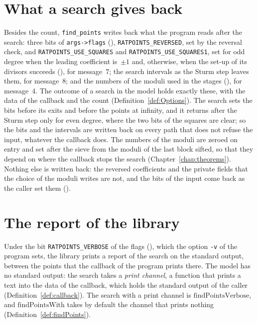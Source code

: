 \section{What a search gives back}\label{sec:outputBack}

Besides the count, \verb|find_points| writes back what the program reads after the search: three
bits of \verb|args->flags| (), \verb|RATPOINTS_REVERSED|, set by the
reversal check, and \verb|RATPOINTS_USE_SQUARES| and \verb|RATPOINTS_USE_SQUARES1|, set for odd
degree when the leading coefficient is~$\pm 1$ and, otherwise, when the set-up of its divisors
succeeds (), for message~7; the search intervals as the Sturm
step leaves them, for message~8; and the numbers of the moduli used in the stages
(), for message~4. The outcome of a search in the model holds exactly
these, with the data of the callback and the count (Definition~\ref{def:Options}). The search sets
the bits before its exits and before the points at infinity, and it returns after the Sturm step
only for even degree, where the two bits of the squares are clear; so the bits and the intervals are
written back on every path that does not refuse the input, whatever the callback does. The numbers
of the moduli are zeroed on entry and set after the sieve from the moduli of the last block sifted,
so that they depend on where the callback stops the search (Chapter~\ref{chap:theorems}). Nothing
else is written back: the reversed coefficients and the private fields that the choice of the moduli
writes are not, and the bits of the input come back as the caller set them
().

\section{The report of the library}\label{sec:outputReport}

Under the bit \verb|RATPOINTS_VERBOSE| of the flags (), which the
option \verb|-v| of the program sets, the library prints a report of the search on the standard
output, between the points that the callback of the program prints there. The model has no standard
output: the search takes a \emph{print channel}, a function that prints a text into the data of the
callback, which holds the standard output of the caller (Definition~\ref{def:callback}). The search
with a print channel is $\mathrm{findPointsVerbose}$, and $\mathrm{findPointsWith}$ takes by default
the channel that prints nothing (Definition~\ref{def:findPoints}).

